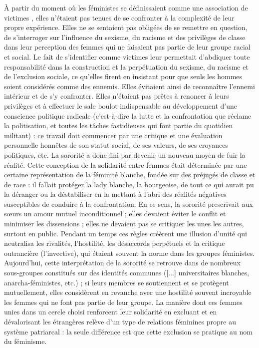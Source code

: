 À partir du moment où les féministes se définissaient comme une association de \og victimes \fg, elles n'étaient pas tenues de se confronter à la complexité de leur propre expérience.
Elles ne se sentaient pas obligées de se remettre en question, de s'interroger sur l'influence du sexisme, du racisme et des privilèges de classe dans leur perception des femmes qui ne faisaient pas partie de leur groupe racial et social.
Le fait de s'identifier comme \og victimes \fg\; leur permettait d'abdiquer toute responsabilité dans la construction et la perpétuation du sexisme, du racisme et de l'exclusion sociale, ce qu'elles firent en insistant pour que seuls les hommes soient considérés comme des ennemis.
Elles évitaient ainsi de reconnaître l'ennemi intérieur et de s'y confronter.
Elles n'étaient pas prêtes à renoncer à leurs privilèges et à effectuer le \og sale boulot \fg\; indispensable au développement d'une conscience politique radicale (c'est-à-dire la lutte et la confrontation que réclame la politisation, et toutes les tâches fastidieuses qui font partie du quotidien militant) : ce travail doit commencer par une critique et une évaluation personnelle honnêtes de son statut social, de ses valeurs, de ses croyances politiques, etc.
La sororité a donc fini par devenir un nouveau moyen de fuir la réalité.
Cette conception de la solidarité entre femmes était déterminée par une certaine représentation de la féminité blanche, fondée sur des préjugés de classe et de race : il fallait protéger la lady blanche, la bourgeoise, de tout ce qui aurait pu la déranger ou la déstabiliser en la mettant à l'abri des réalités négatives susceptibles de conduire à la confrontation.
En ce sens, la sororité prescrivait aux s\oe{}urs un amour mutuel \og inconditionnel \fg\; ; elles devaient éviter le conflit et minimiser les dissensions ; elles ne devaient pas se critiquer les unes les autres, surtout en public.
Pendant un temps ces règles créèrent une illusion d'unité qui neutralisa les rivalités, l'hostilité, les désaccords perpétuels et la critique outrancière (l'invective), qui étaient souvent la norme dans les groupes féministes.
Aujourd'hui, cette interprétation de la sororité se retrouve dans de nombreux sous-groupes constitués sur des identités communes ([...] universitaires blanches, anarcha-féministes, etc.) ; si leurs membres se soutiennent et se protègent mutuellement, elles considèrent en revanche avec une hostilité souvent incroyable les femmes qui ne font pas partie de leur groupe.
La manière dont ces femmes unies dans un cercle choisi renforcent leur solidarité en excluant et en dévalorisant les étrangères relève d'un type de relations féminines propre au système patriarcal : la seule différence est que cette exclusion se pratique au nom du féminisme.
\bigskip

